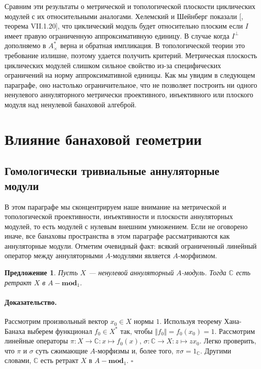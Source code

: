 \documentclass[12pt]{article}
\newtheorem{proposition}[theorem]{Предложение}
\renewenvironment{proof}{\paragraph{Доказательство.}}{\hfill$\square$\medskip}
\begin{document}
Сравним эти результаты о метрической и топологической плоскости циклических
модулей с их относительными аналогами. Хелемский и Шейнберг показали
[\cite{HelHomolBanTopAlg}, теорема VII.1.20], что циклический модуль будет
относительно плоским если $I$ имеет правую ограниченную аппроксимативную
единицу. В случае когда $I^\perp$ дополняемо в $A_\times^*$ верна и обратная
импликация. В топологической теории это требование излишне, поэтому удается
получить критерий. Метрическая плоскость циклических модулей слишком сильное
свойство из-за специфических ограничений на норму аппроксимативной единицы. Как
мы увидим в следующем параграфе, оно настолько ограничительное, что не позволяет
построить ни одного ненулевого аннуляторного метрически проективного,
инъективного или плоского модуля над ненулевой банаховой алгеброй.


\section{Влияние банаховой геометрии}\label{SectionTheImpactOfBanachGeometry}



\subsection{Гомологически тривиальные аннуляторные
    модули}\label{SubSectionHomoligicallyTrivialAnnihilatorModules}

В этом параграфе мы сконцентрируем наше внимание на метрической и топологической
проективности, инъективности и плоскости аннуляторных модулей, то есть модулей с
нулевым внешним умножением. Если не оговорено иначе, все банаховы пространства в
этом параграфе рассматриваются как аннуляторные модули. Отметим очевидный факт:
всякий ограниченный линейный оператор между аннуляторными $A$-модулями является
$A$-морфизмом.

\begin{proposition}\label{AnnihCModIsRetAnnihMod} Пусть $X$ --- ненулевой
    аннуляторный $A$-модуль. Тогда $\mathbb{C}$ есть ретракт $X$ в
    $A-\mathbf{mod}_1$.
\end{proposition}
\begin{proof} Рассмотрим произвольный вектор $x_0\in X$ нормы $1$. Используя
    теорему Хана-Банаха выберем функционал $f_0\in X^*$ так, чтобы 
    $\Vert f_0\Vert=f_0(x_0)=1$. Рассмотрим линейные операторы 
    $\pi:X\to \mathbb{C}:x\mapsto f_0(x)$, 
    $\sigma:\mathbb{C}\to X:z\mapsto zx_0$. 
    Легко проверить, что $\pi$ и $\sigma$ суть сжимающие $A$-морфизмы и, 
    более того, $\pi\sigma=1_\mathbb{C}$. Другими словами, 
    $\mathbb{C}$ есть ретракт $X$ в $A-\mathbf{mod}_1$.
\end{proof}
\end{document}
